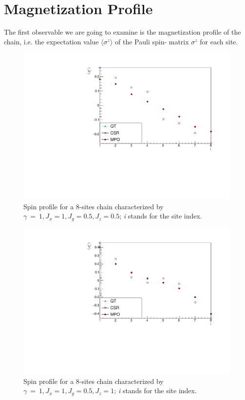 \section{Magnetization Profile}
The first observable we are going to examine is the magnetization profile of the chain, i.e. the expectation value $\langle \sigma^z \rangle$ of the Pauli spin- matrix $\sigma^z$ for each site. 

\begin{figure}[H]
    \centering
    \includegraphics[scale=0.7]{Figures/8sites_comparison/LMComparison_8sJ10505.pdf}
    \caption{Spin profile for a 8-sites chain characterized by $\gamma~=~1, J_x=1, J_y=0.5, J_z=0.5$; \emph{i} stands for the site index.}
    \label{fig:8sites_LMcomparisonJz05}
\end{figure}

\begin{figure}[H]
    \centering
    \includegraphics[scale=0.7]{Figures/8sites_comparison/LMComparison_8sJ1051.pdf}
    \caption{Spin profile for a 8-sites chain characterized by $\gamma~=~1, J_x=1, J_y=0.5, J_z=1$; \emph{i} stands for the site index.}
    \label{fig:8sites_LMcomparisonJz1}
\end{figure}

